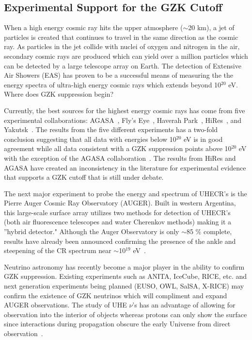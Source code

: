 \subsection{Experimental Support for the GZK Cutoff}
\label{s:uhecrDetection}
When a high energy cosmic ray hits the upper atmosphere ($\sim$20 km), a jet of particles is created that continues to travel in the same direction as the cosmic ray.  As particles in the jet collide with nuclei of oxygen and nitrogen in the air, secondary cosmic rays are produced which can yield over a million particles which can be detected by a large telescope array on Earth.  The detection of Extensive Air Showers (EAS) has proven to be a successful means of measuring the the energy spectra of ultra-high energy cosmic rays which extends beyond 10$^{20}$ eV.  Where does GZK suppression begin?

\par Currently, the best sources for the highest energy cosmic rays has come from five experimental collaborations:  AGASA~\cite{AGASA.1998}, Fly's Eye~\cite{FLYSEYE.1993}, Haverah Park~\cite{haverah.2002}, HiRes~\cite{HiRES.2003}, and Yakutsk~\cite{Yakutsk.1991}.  The results from the five different experiments has a two-fold conclusion suggesting that all data with energies below 10$^{20}$ eV is in good agreement while all data consistent with a GZK suppression points above 10$^{20}$ eV with the exception of the AGASA collaboration~\cite{Bahcall.2003}.  The results from HiRes and AGASA have created an inconsistency in the literature for experimental evidence that supports a GZK cutoff that is still under debate.

\par The next major experiment to probe the energy and spectrum of UHECR's is the Pierre Auger Cosmic Ray Observatory (AUGER).  Built in western Argentina, this large-scale surface array utilizes two methods for detection of UHECR's (both air fluorescence telescopes and water Cherenkov methods) making it a ''hybrid detector."  Although the Auger Observatory is only $\sim$85 \% complete, results have already been announced confirming the presence of the ankle and steepening of the CR spectrum near $\sim$10$^{19}$ eV~\cite{icrc0318}.

\par Neutrino astronomy has recently become a major player in the ability to confirm GZK suppression.  Existing experiments such as ANITA, IceCube, RICE, etc. and next generation experiments being planned (EUSO, OWL, SalSA, X-RICE) may confirm the existence of GZK neutrinos which will compliment and expand AUGER observations.  The study of UHE $\nu$'s has an advantage of allowing for observation into the interior of objects whereas protons can only show the surface since interactions during propagation obscure the early Universe from direct observation~\cite{Seckel.2005}.